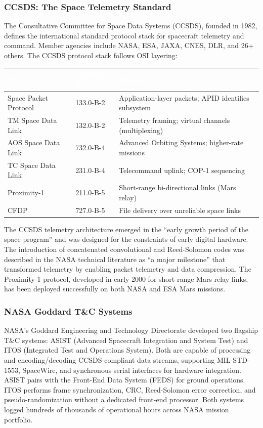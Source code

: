 \documentclass[11pt,letterpaper]{article}
\newcommand{\tableheader}[1]{\textbf{\sffamily\textcolor{white}{#1}}}
\begin{document}
\subsubsection{CCSDS: The Space Telemetry Standard}

The Consultative Committee for Space Data Systems (CCSDS), founded in 1982, defines the international standard protocol stack for spacecraft telemetry and command. Member agencies include NASA, ESA, JAXA, CNES, DLR, and 26+ others. The CCSDS protocol stack follows OSI layering:

\begin{center}
\begin{tabularx}{\textwidth}{L{3.5cm}L{3cm}X}
\toprule
{}
\tableheader{Protocol} & \tableheader{CCSDS ID} & \tableheader{Function} \\
\midrule
Space Packet Protocol & 133.0-B-2 & Application-layer packets; APID identifies subsystem \\
TM Space Data Link & 132.0-B-2 & Telemetry framing; virtual channels (multiplexing) \\
AOS Space Data Link & 732.0-B-4 & Advanced Orbiting Systems; higher-rate missions \\
TC Space Data Link & 231.0-B-4 & Telecommand uplink; COP-1 sequencing \\
Proximity-1 & 211.0-B-5 & Short-range bi-directional links (Mars relay) \\
CFDP & 727.0-B-5 & File delivery over unreliable space links \\
\bottomrule
\end{tabularx}
\end{center}

The CCSDS telemetry architecture emerged in the ``early growth period of the space program'' and was designed for the constraints of early digital hardware. The introduction of concatenated convolutional and Reed-Solomon codes was described in the NASA technical literature as ``a major milestone'' that transformed telemetry by enabling packet telemetry and data compression. The Proximity-1 protocol, developed in early 2000 for short-range Mars relay links, has been deployed successfully on both NASA and ESA Mars missions.

\subsubsection{NASA Goddard T\&C Systems}

NASA's Goddard Engineering and Technology Directorate developed two flagship T\&C systems: ASIST (Advanced Spacecraft Integration and System Test) and ITOS (Integrated Test and Operations System). Both are capable of processing and encoding/decoding CCSDS-compliant data streams, supporting MIL-STD-1553, SpaceWire, and synchronous serial interfaces for hardware integration. ASIST pairs with the Front-End Data System (FEDS) for ground operations. ITOS performs frame synchronization, CRC, Reed-Solomon error correction, and pseudo-randomization without a dedicated front-end processor. Both systems logged hundreds of thousands of operational hours across NASA mission portfolio.
\end{document}
